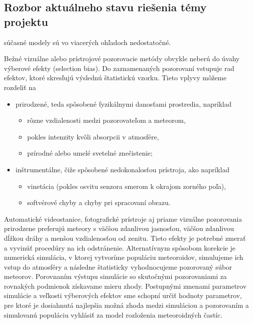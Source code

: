 \subsection{Rozbor aktuálneho stavu riešenia témy
projektu}\label{rozbor-aktuuxe1lneho-stavu-rieux161enia-tuxe9my-projektu}

súčasné modely sú vo viacerých ohľadoch nedostatočné.

Bežné vizuálne alebo prístrojové pozorovacie metódy obvykle neberú do
úvahy výberové efekty (selection bias). Do zaznamenaných pozorovaní
vstupuje rad efektov, ktoré skresľujú výslednú štatistickú vzorku. Tieto
vplyvy môžeme rozdeliť na

\begin{itemize}
\tightlist
\item
  prirodzené, teda spôsobené fyzikálnymi danosťami prostredia, napríklad

  \begin{itemize}
  \tightlist
  \item
    rôzne vzdialenosti medzi pozorovateľom a meteorom,
  \item
    pokles intenzity kvôli absorpcii v atmosfére,
  \item
    prírodné alebo umelé svetelné znečistenie;
  \end{itemize}
\item
  inštrumentálne, čiže spôsobené nedokonalosťou prístroja, ako napríklad

  \begin{itemize}
  \tightlist
  \item
    vinetácia (pokles osvitu senzora smerom k okrajom zorného poľa),
  \item
    softvérové chyby a chyby pri spracovaní obrazu.
  \end{itemize}
\end{itemize}

Automatické videostanice, fotografické prístroje aj priame vizuálne
pozorovania prirodzene preferujú meteory s väčšou zdanlivou jasnosťou,
väčšou zdanlivou dĺžkou dráhy a menšou vzdialenosťou od zenitu. Tieto
efekty je potrebné zmerať a vyvinúť procedúry na ich odstránenie.
Alternatívnym spôsobom korekcie je numerická simulácia, v ktorej
vytvoríme populáciu meteoroidov, simulujeme ich vstup do atmosféry a
následne štatisticky vyhodnocujeme pozorovaný súbor meteorov. Porovnaním
výstupu simulácie so skutočnými pozorovaniami za rovnakých podmienok
získavame mieru zhody. Postupnými zmenami parametrov simulácie a
veľkosti výberových efektov sme schopní určiť hodnoty parametrov, pre
ktoré je dosiahnutá najlepšia možná zhoda medzi simuláciou a pozorovaním
a simulovanú populáciu vyhlásiť za model rozloženia meteoroidných
častíc.

